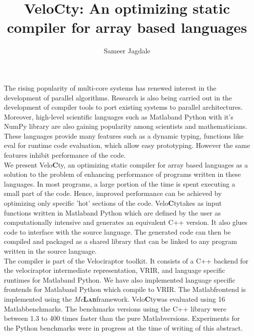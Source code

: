 \documentclass[a4paper, 12pt]{article}
\newcommand{\matlab}{{\textsc Matlab}\space}
\newcommand{\velocty}{{Velo\textbf{C}ty}\space}
\newcommand{\smclab}{\textrm{\textsl{Mc}\textbf{\textsc{Lab}}}}
\newcommand{\mclab}{\smclab\space}
\begin{document}
\title{\velocty : An optimizing static compiler for array based languages}
\author{Sameer Jagdale}
\maketitle
The rising popularity of multi-core systems has renewed interest in the development of parallel algorithms. Research is also being carried out in the development of compiler tools to port existing systems to parallel architectures. Moreover, high-level scientific languages such as \matlab and Python with it's NumPy library are also gaining popularity among scientists and mathematicians. These languages provide many features such as a dynamic typing, functions like eval for runtime code evaluation, which allow easy prototyping. However the same features inhibit performance of the code. \\
We present \velocty, an optimizing static compiler for array based languages as a solution to the problem of enhancing performance of programs written in these languages. In most programs, a large portion of the time is spent executing a small part of the code. Hence, improved performance can be achieved by optimizing only specific 'hot' sections of the code. \velocty takes as input functions written in \matlab and Python which are defined by the user as computationally intensive and generates an equivalent C++ version. It also glues code to interface with the source language. The generated code can then be compiled and packaged as a shared library that can be linked to any program written in the source language.\\
The compiler is part of the Velociraptor toolkit. It consists of a C++ backend for the velociraptor intermediate representation, VRIR, and language specific runtimes for \matlab and Python. We have also implemented language specific frontends for \matlab and Python which compile to VRIR. The \matlab frontend is implemented using the \mclab framework.
\velocty was evaluated using 16 \matlab benchmarks. The benchmarks versions using the C++ library were between 1.3 to 400 times faster than the pure \matlab versions. Experiments for the Python benchmarks were in progress at the time of writing of this abstract.  
\end{document}

